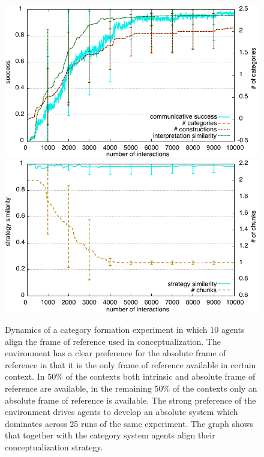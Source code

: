 \begin{figure}
\begin{center}
\includegraphics[width=0.9\columnwidth]{figs/chunk-alignment-frames-absolute-vs-intrinsic}
\includegraphics[width=0.9\columnwidth]{figs/chunk-alignment-frames-absolute-vs-intrinsic-alignment}
\end{center}
\caption[Results category formation and frame of reference alignment]{%
Dynamics of a category formation experiment in which 10 agents align the frame of reference
used in conceptualization. The environment has a clear preference for the absolute frame of reference
in that it is the only frame of reference available in certain context. 
In $50\si{\percent}$ of the contexts both intrinsic and absolute
frame of reference are available, in the remaining $50\si{\percent}$ of the contexts only an absolute frame
of reference is available. The strong preference of the environment drives agents to develop 
an absolute system which dominates across 25 runs of the same experiment. The graph shows 
that together with the category system agents align their conceptualization strategy.}
\label{f:chunk-alignment-frames-absolute-vs-intrinsic}
\end{figure}



